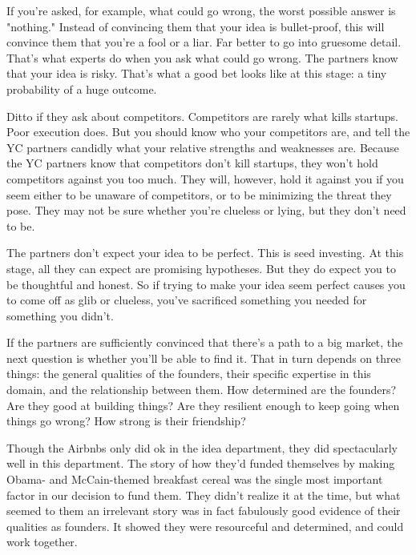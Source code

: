 If you're asked, for example, what could
                  go wrong, the worst possible answer is "nothing." Instead of
                  convincing them that your idea is bullet-proof, this will
                  convince them that you're a fool or a liar. Far better to go
                  into gruesome detail. That's what experts do when you ask what
                  could go wrong. The partners know that your idea is risky.
                  That's what a good bet looks like at this stage: a tiny
                  probability of a huge outcome.

Ditto if they ask
                  about competitors. Competitors are rarely what kills startups.
                  Poor execution does. But you should know who your competitors
                  are, and tell the YC partners candidly what your relative
                  strengths and weaknesses are. Because the YC partners know
                  that competitors don't kill startups, they won't hold
                  competitors against you too much. They will, however, hold it
                  against you if you seem either to be unaware of competitors,
                  or to be minimizing the threat they pose. They may not be sure
                  whether you're clueless or lying, but they don't need to
                  be.

The partners don't expect your idea to be
                  perfect. This is seed investing. At this stage, all they can
                  expect are promising hypotheses. But they do expect you to be
                  thoughtful and honest. So if trying to make your idea seem
                  perfect causes you to come off as glib or clueless, you've
                  sacrificed something you needed for something you didn't.

If
                  the partners are sufficiently convinced that there's a path to
                  a big market, the next question is whether you'll be able to
                  find it. That in turn depends on three things: the general
                  qualities of the founders, their specific expertise in this
                  domain, and the relationship between them. How determined are
                  the founders? Are they good at building things? Are they
                  resilient enough to keep going when things go wrong? How
                  strong is their friendship?

Though the Airbnbs only
                  did ok in the idea department, they did spectacularly well in
                  this department. The story of how they'd funded themselves by
                  making Obama- and McCain-themed breakfast cereal was the
                  single most important factor in our decision to fund them.
                  They didn't realize it at the time, but what seemed to them an
                  irrelevant story was in fact fabulously good evidence of their
                  qualities as founders. It showed they were resourceful and
                  determined, and could work together.

